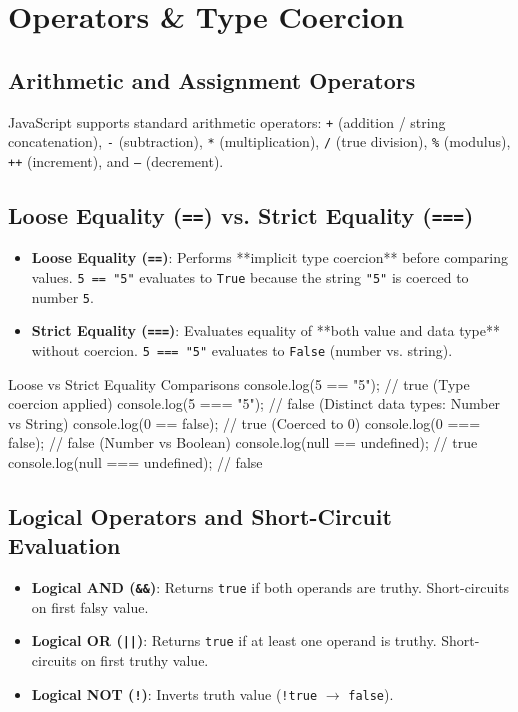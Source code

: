 \section{Operators \& Type Coercion}

\subsection{Arithmetic and Assignment Operators}
JavaScript supports standard arithmetic operators: \texttt{+} (addition / string concatenation), \texttt{-} (subtraction), \texttt{*} (multiplication), \texttt{/} (true division), \texttt{\%} (modulus), \texttt{++} (increment), and \texttt{--} (decrement).

\subsection{Loose Equality (\texttt{==}) vs. Strict Equality (\texttt{===})}
\begin{conceptbox}
\begin{itemize}[leftmargin=1.5em]
    \item \textbf{Loose Equality (\texttt{==})}: Performs **implicit type coercion** before comparing values. \texttt{5 == "5"} evaluates to \texttt{True} because the string \texttt{"5"} is coerced to number \texttt{5}.
    \item \textbf{Strict Equality (\texttt{===})}: Evaluates equality of **both value and data type** without coercion. \texttt{5 === "5"} evaluates to \texttt{False} (number vs. string).
\end{itemize}
\end{conceptbox}

\begin{jscode}{Loose vs Strict Equality Comparisons}
console.log(5 == "5");     // true  (Type coercion applied)
console.log(5 === "5");    // false (Distinct data types: Number vs String)
console.log(0 == false);   // true  (Coerced to 0)
console.log(0 === false);  // false (Number vs Boolean)
console.log(null == undefined);  // true
console.log(null === undefined); // false
\end{jscode}

\subsection{Logical Operators and Short-Circuit Evaluation}
\begin{itemize}[leftmargin=1.5em]
    \item \textbf{Logical AND (\texttt{\&\&})}: Returns \texttt{true} if both operands are truthy. Short-circuits on first falsy value.
    \item \textbf{Logical OR (\texttt{||})}: Returns \texttt{true} if at least one operand is truthy. Short-circuits on first truthy value.
    \item \textbf{Logical NOT (\texttt{!})}: Inverts truth value (\texttt{!true} $\to$ \texttt{false}).
\end{itemize}

